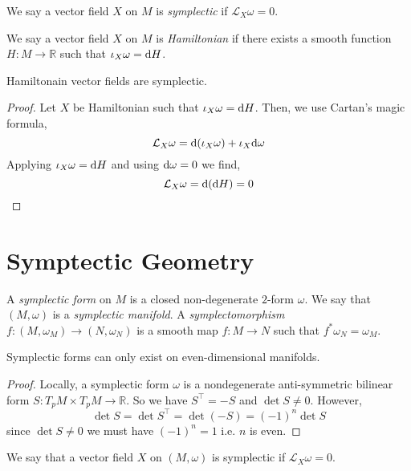 \documentclass[12pt]{extarticle}
\renewcommand{\L}{\mathcal{L}}
\newcommand{\R}{\mathbb{R}}
\begin{document}
\begin{defn}
We say a vector field $X$ on $M$ is \textit{symplectic} if $\L_X \omega = 0$. 
\end{defn}

\begin{defn}
We say a vector field $X$ on $M$ is \textit{Hamiltonian} if there exists a smooth function $H : M \to \R$ such that $\iota_X \omega = \mathrm{d}{H}$. 
\end{defn}

\begin{lemma}
Hamiltonain vector fields are symplectic.
\end{lemma}

\begin{proof}
Let $X$ be Hamiltonian such that $\iota_X \omega = \mathrm{d}{H}$. Then, we use Cartan's magic formula,
\[ \L_X \omega = \d (\iota_X \omega) + \iota_X \d \omega \]
Applying $\iota_X \omega = \mathrm{d}{H}$ and using $\mathrm{d}{\omega} = 0$ we find,
\[ \L_X \omega = \d(\d{H}) = 0 \]
\end{proof}

\section{Symptectic Geometry}

\begin{definition}
A \textit{symplectic form} on $M$ is a closed non-degenerate $2$-form $\omega$. We say that $(M, \omega)$ is a \textit{symplectic manifold}. A \textit{symplectomorphism} $f : (M, \omega_M) \to (N, \omega_N)$ is a smooth map $f : M \to N$ such that $f^* \omega_N = \omega_M$. 
\end{definition}

\begin{lemma}
Symplectic forms can only exist on even-dimensional manifolds. 
\end{lemma}

\begin{proof}
Locally, a symplectic form $\omega$ is a nondegenerate anti-symmetric bilinear form $S : T_p M \times T_p M \to \R$. So we have $S^\top = - S$ and $\det{S} \neq 0$. However, \[ \det{S} = \det{S^\top} = \det{(- S)} = (-1)^n \det{S} \]
since $\det{S} \neq 0$ we must have $(-1)^n = 1$ i.e. $n$ is even.
\end{proof}

\begin{definition}
We say that a vector field $X$ on $(M, \omega)$ is symplectic if $\L_X \omega = 0$.
\end{definition}
\end{document}
